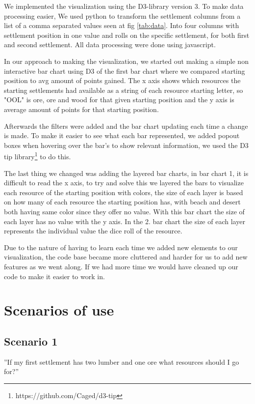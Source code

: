 \documentclass[journal]{vgtc}                %
\begin{document}
We implemented the visualization using the D3-library version 3. To make
data processing easier, We used python to transform the settlement columns
from a list of a comma separated values seen at fig \ref{tab:data}. Into
four columns with settlement position in one value and rolls on the specific
settlement, for both first and second settlement. All data processing were
done using javascript.

In our approach to making the visualization, we started out making a simple non
interactive bar chart using D3 of the first bar chart where we compared starting position to avg amount of points gained.
The x axis shows which resources the starting settlements had available as a string of each resource starting letter,
so "OOL" is ore, ore and wood for that given starting position and the y axis is average amount of points for that starting position.

Afterwards the filters were added and the bar chart updating each time a change is made.
To make it easier to see what each bar represented, we added popout boxes when
hovering over the bar's to show relevant information, we used the D3 tip library\footnote{https://github.com/Caged/d3-tip}
to do this.

The last thing we changed was adding the layered bar charts,
in bar chart 1, it is difficult to read the x axis, to try and solve this we layered
the bars to visualize each resource of the starting position with colors,
the size of each layer is based on how many of each resource the starting position has,
with beach and desert both having same color since they offer no value. With this bar chart
the size of each layer has no value with the y axis. In the 2. bar chart the size of each
layer represents the individual value the dice roll of the resource.

Due to the nature of having to learn each time we added new elements to our visualization, the code base became more cluttered and harder for us to add new features as we went along. If we had more time we would have cleaned up our code to make it easier to work in.
\section{Scenarios of use}

\subsection{Scenario 1}

”If my first settlement has two lumber and one ore what resources should I go
for?”
\end{document}
